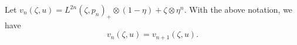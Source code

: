 Let $v_n(\zeta, u) = L^{2n}(\zeta, p_n)_+ \otimes (1 - \eta) + \zeta \otimes \eta^n$. With the above notation, we have
$$v_n(\zeta, u) = v_{n+1}(\zeta, u).$$
